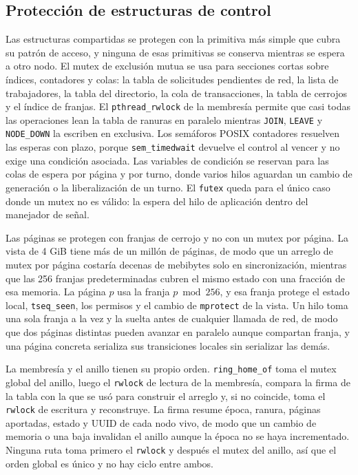 \subsection{Protección de estructuras de control}

Las estructuras compartidas se protegen con la primitiva más simple que cubra su patrón de acceso, y ninguna de esas primitivas se conserva mientras se espera a otro nodo. El mutex de exclusión mutua se usa para secciones cortas sobre índices, contadores y colas: la tabla de solicitudes pendientes de red, la lista de trabajadores, la tabla del directorio, la cola de transacciones, la tabla de cerrojos y el índice de franjas. El \texttt{pthread\_rwlock} de la membresía permite que casi todas las operaciones lean la tabla de ranuras en paralelo mientras \texttt{JOIN}, \texttt{LEAVE} y \texttt{NODE\_DOWN} la escriben en exclusiva. Los semáforos POSIX contadores resuelven las esperas con plazo, porque \texttt{sem\_timedwait} devuelve el control al vencer y no exige una condición asociada. Las variables de condición se reservan para las colas de espera por página y por turno, donde varios hilos aguardan un cambio de generación o la liberalización de un turno. El \texttt{futex} queda para el único caso donde un mutex no es válido: la espera del hilo de aplicación dentro del manejador de señal.

Las páginas se protegen con franjas de cerrojo y no con un mutex por página. La vista de 4 GiB tiene más de un millón de páginas, de modo que un arreglo de mutex por página costaría decenas de mebibytes solo en sincronización, mientras que las 256 franjas predeterminadas cubren el mismo estado con una fracción de esa memoria. La página $p$ usa la franja $p \bmod 256$, y esa franja protege el estado local, \texttt{tseq\_seen}, los permisos y el cambio de \texttt{mprotect} de la vista. Un hilo toma una sola franja a la vez y la suelta antes de cualquier llamada de red, de modo que dos páginas distintas pueden avanzar en paralelo aunque compartan franja, y una página concreta serializa sus transiciones locales sin serializar las demás.

La membresía y el anillo tienen su propio orden. \texttt{ring\_home\_of} toma el mutex global del anillo, luego el \texttt{rwlock} de lectura de la membresía, compara la firma de la tabla con la que se usó para construir el arreglo y, si no coincide, toma el \texttt{rwlock} de escritura y reconstruye. La firma resume época, ranura, páginas aportadas, estado y UUID de cada nodo vivo, de modo que un cambio de memoria o una baja invalidan el anillo aunque la época no se haya incrementado. Ninguna ruta toma primero el \texttt{rwlock} y después el mutex del anillo, así que el orden global es único y no hay ciclo entre ambos.

